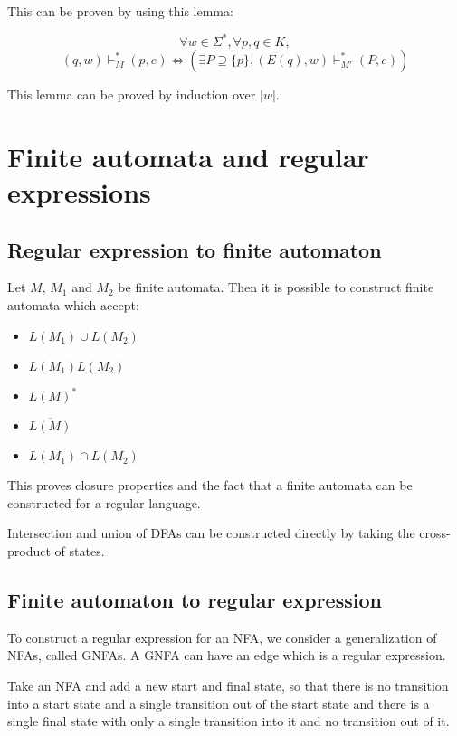 This can be proven by using this lemma:
\begin{lemma}
\[ \forall w \in \Sigma^*, \forall p, q \in K, \]
\[ (q, w) \vdash_M^* (p, e) \iff \left(\exists P \supseteq \{p\}, (E(q), w) \vdash_{M'}^* (P, e) \right) \]
\end{lemma}
This lemma can be proved by induction over $|w|$.

\section{Finite automata and regular expressions}

\subsection{Regular expression to finite automaton}

\begin{theorem}
Let $M$, $M_1$ and $M_2$ be finite automata.
Then it is possible to construct finite automata which accept:

\begin{itemize}
\item $L(M_1) \cup L(M_2)$
\item $L(M_1)L(M_2)$
\item $L(M)^*$
\item $\overline{L(M)}$
\item $L(M_1) \cap L(M_2)$
\end{itemize}
\end{theorem}

This proves closure properties and the fact that
a finite automata can be constructed for a regular language.

Intersection and union of DFAs can be constructed
directly by taking the cross-product of states.

\subsection{Finite automaton to regular expression}

To construct a regular expression for an NFA,
we consider a generalization of NFAs, called GNFAs.
A GNFA can have an edge which is a regular expression.

Take an NFA and add a new start and final state, so that
there is no transition into a start state and a single transition out of the start state and
there is a single final state with only a single transition into it and no transition out of it.

